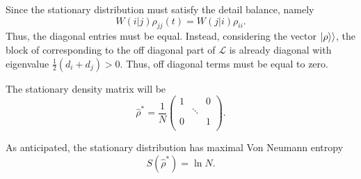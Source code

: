 Since the stationary distribution must satisfy the detail balance, namely
\begin{equation}
    W(i|j)\rho_{jj}(t) = W(j|i)\rho_{ii}.
\end{equation}
Thus, the diagonal entries must be equal. 
Instead, considering the vector $\lvert\rho\rangle\rangle$, the block of corresponding to the off diagonal part of $\mathcal{L}$ is already diagonal with eigenvalue $\frac{1}{2}(d_i + d_j)>0$. Thus, off diagonal terms must be equal to zero.

The stationary density matrix will be
\begin{equation}
    \hat\rho^* = \frac{1}{N}\begin{pmatrix}
        1&&0\\
        &\ddots&\\
        0&&1\\
    \end{pmatrix}.
\end{equation}

As anticipated, the stationary distribution has maximal Von Neumann entropy 
\begin{equation}
    S\left(\hat\rho^*\right) = \ln N.
\end{equation}
